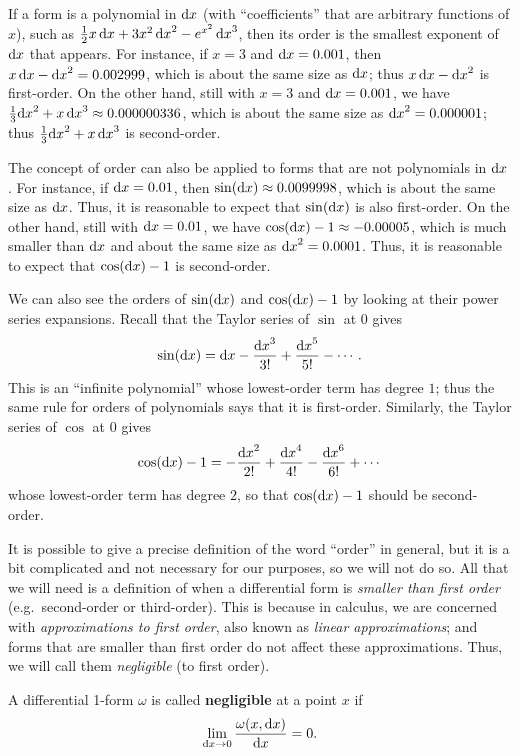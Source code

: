 If a form is a polynomial in ${\mathrm{d} x}$ (with ``coefficients'' that are arbitrary functions of $x$), such as $\textstyle\frac{1}{2} x\,{\mathrm{d} x} + 3x^2\,{\mathrm{d} x}^2 - e^{x^2}\, {\mathrm{d} x}^3$, then its order is the smallest exponent of ${\mathrm{d} x}$ that appears.
For instance, if $x=3$ and ${\mathrm{d} x}=0.001$, then $x\,{\mathrm{d} x} - {\mathrm{d} x}^2 = 0.002999$, which is about the same size as ${\mathrm{d} x}$; thus $x\,{\mathrm{d} x} - {\mathrm{d} x}^2$ is first-order.
On the other hand, still with $x=3$ and ${\mathrm{d} x}=0.001$, we have $\frac{1}{3}{\mathrm{d} x}^2 + x \,{\mathrm{d} x}^3 \approx 0.000000336$, which is about the same size as ${\mathrm{d} x}^2 = 0.000001$; thus $\frac{1}{3}{\mathrm{d} x}^2 + x \,{\mathrm{d} x}^3$ is second-order.

The concept of order can also be applied to forms that are not polynomials in ${\mathrm{d} x}$.
For instance, if ${\mathrm{d} x}=0.01$, then $\sin({\mathrm{d} x}) \approx 0.0099998$, which is about the same size as ${\mathrm{d} x}$.
Thus, it is reasonable to expect that $\sin({\mathrm{d} x})$ is also first-order.
On the other hand, still with ${\mathrm{d} x}=0.01$, we have $\cos({\mathrm{d} x}) - 1 \approx -0.00005$, which is much smaller than ${\mathrm{d} x}$ and about the same size as ${\mathrm{d} x}^2 = 0.0001$.
Thus, it is reasonable to expect that $\cos({\mathrm{d} x}) - 1$ is second-order.

We can also see the orders of $\sin({\mathrm{d} x})$ and $\cos({\mathrm{d} x})-1$ by looking at their power series expansions.
Recall that the Taylor series of $\sin$ at $0$ gives
\[ \sin({\mathrm{d} x}) = {\mathrm{d} x} - \frac{{\mathrm{d} x}^3}{3!} + \frac{{\mathrm{d} x}^5}{5!} - \cdots. \]
This is an ``infinite polynomial'' whose lowest-order term has degree $1$; thus the same rule for orders of polynomials says that it is first-order.
Similarly, the Taylor series of $\cos$ at $0$ gives
\[ \cos({\mathrm{d} x}) - 1 = - \frac{{\mathrm{d} x}^2}{2!} + \frac{{\mathrm{d} x}^4}{4!}- \frac{{\mathrm{d} x}^6}{6!} + \cdots \]
whose lowest-order term has degree $2$, so that $\cos({\mathrm{d} x})-1$ should be second-order.

It is possible to give a precise definition of the word ``order'' in general, but it is a bit complicated and not necessary for our purposes, so we will not do so.
All that we will need is a definition of when a differential form is \emph{smaller than first order} (e.g.\ second-order or third-order).
This is because in calculus, we are concerned with \emph{approximations to first order}, also known as \emph{linear approximations}; and forms that are smaller than first order do not affect these approximations.
Thus, we will call them \emph{negligible} (to first order).

\begin{defn}\label{def:negligible}
  A differential 1-form $\omega$ is called \textbf{negligible} at a point $x$ if
  \[ \lim_{{\mathrm{d} x}\to 0} \frac{\omega(x,{\mathrm{d} x})}{{\mathrm{d} x}} = 0. \]
\end{defn}

